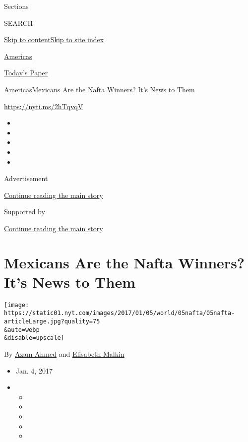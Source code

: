 Sections

SEARCH

\protect\hyperlink{site-content}{Skip to
content}\protect\hyperlink{site-index}{Skip to site index}

\href{https://www.nytimes.com/section/world/americas}{Americas}

\href{https://myaccount.nytimes.com/auth/login?response_type=cookie\&client_id=vi}{}

\href{https://www.nytimes.com/section/todayspaper}{Today's Paper}

\href{/section/world/americas}{Americas}\textbar{}Mexicans Are the Nafta
Winners? It's News to Them

\url{https://nyti.ms/2hTqvqV}

\begin{itemize}
\item
\item
\item
\item
\item
\end{itemize}

Advertisement

\protect\hyperlink{after-top}{Continue reading the main story}

Supported by

\protect\hyperlink{after-sponsor}{Continue reading the main story}

\hypertarget{mexicans-are-the-nafta-winners-its-news-to-them}{%
\section{Mexicans Are the Nafta Winners? It's News to
Them}\label{mexicans-are-the-nafta-winners-its-news-to-them}}

\texttt{[image: https://static01.nyt.com/images/2017/01/05/world/05nafta/05nafta-articleLarge.jpg?quality=75\\\&auto=webp\\\&disable=upscale]}

By \href{http://www.nytimes.com/by/azam-ahmed}{Azam Ahmed} and
\href{https://www.nytimes.com/by/elisabeth-malkin}{Elisabeth Malkin}

\begin{itemize}
\item
  Jan. 4, 2017
\item
  \begin{itemize}
  \item
  \item
  \item
  \item
  \item
  \end{itemize}
\end{itemize}

